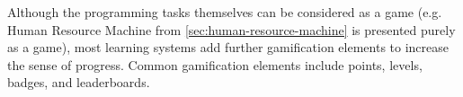 
Although the programming tasks themselves can be considered as a game
(e.g. Human Resource Machine from \cref{sec:human-resource-machine} is
presented purely as a game),
most learning systems add further gamification elements to increase the sense
of progress.
Common gamification elements include points, levels, badges, and leaderboards.

